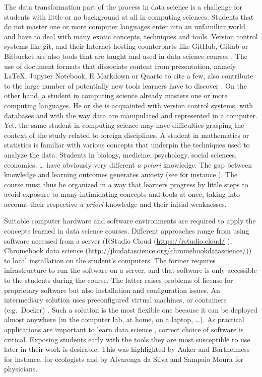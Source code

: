 \documentclass{aims}
\theoremstyle{definition}
\begin{document}
The data transformation part of the process in data science is a
challenge for students with little or no background at all in computing
sciences. Students that do not master one or more computer languages
enter into an unfamiliar world and have to deal with many exotic
concepts, techniques and tools. Version control systems like git, and
their Internet hosting counterparts like GitHub, Gitlab or Bitbucket are
also tools that are taught and used in data science courses
\cite{Fiksel2019, Hsing2019}. The use of document formats that
dissociate content from presentation, namely LaTeX, Jupyter Notebook, R
Markdown or Quarto to cite a few, also contribute to the large number of
potentially new tools learners have to discover \cite{Baumer2014}. On
the other hand, a student in computing science already masters one or
more computing languages. He or she is acquainted with version control
systems, with databases and with the way data are manipulated and
represented in a computer. Yet, the same student in computing science
may have difficulties grasping the context of the study related to
foreign disciplines. A student in mathematics or statistics is familiar
with various concepts that underpin the techniques used to analyze the
data. Students in biology, medicine, psychology, social sciences,
economics, \ldots{} have obviously very different \emph{a priori}
knowledge. The gap between knowledge and learning outcomes generates
anxiety (see for instance \cite{Onwuegbuzie2003}). The course must thus
be organized in a way that learners progress by little steps to avoid
exposure to many intimidating concepts and tools at once, taking into
account their respective \emph{a priori} knowledge and their initial
weaknesses.

Suitable computer hardware and software environments are required to
apply the concepts learned in data science courses. Different approaches
range from using software accessed from a server \cite{Theobold2021}
(RStudio Cloud (\url{https://rstudio.cloud/} \cite{Rstudio2015}),
Chromebook data science
(\url{http://jhudatascience.org/chromebookdatascience/})) to local
installation on the student's computers. The former requires
infrastructure to run the software on a server, and that software is
only accessible to the students during the course. The latter raises
problems of license for proprietary software but also installation and
configuration issues. An intermediary solution uses preconfigured
virtual machines, or containers (e.g.~Docker)
\cite{Cetinkaya-Rundel2018, Boettiger2015}. Such a solution is the most
flexible one because it can be deployed almost anywhere (in the computer
lab, at home, on a laptop, \ldots). As practical applications are
important to learn data science \cite{Larwin2011}, correct choice of
software is critical. Exposing students early with the tools they are
most susceptible to use later in their work is desirable. This was
highlighted by Auker and Barthelmess \cite{Auker2020} for instance, for
ecologists and by Alvarenga da Silva and Sampaio Moura
\cite{Alvarenga2020} for physicians.
\end{document}

